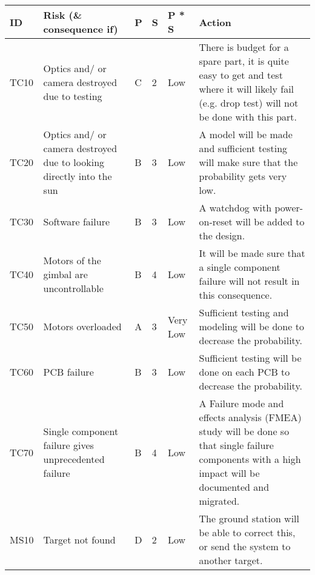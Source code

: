 

\begin{longtable}{|m{}| m{} |m{} |m{}|m{}| m{}|}

\hline
\textbf{ID} & \textbf{Risk (\& consequence if)} & \textbf{P} & \textbf{S} & \textbf{P * S} & \textbf{Action} \\ \hline


TC10 & Optics and/ or camera destroyed due to testing						& C & 2 & \cellcolor[HTML]{FCFF2F}Low 		& There is budget for a spare part, it is quite easy to get and test where it will likely fail (e.g. drop test) will not be done with this part.\\\hline

TC20 & Optics and/ or camera destroyed due to looking directly into the sun & B & 3 & \cellcolor[HTML]{FCFF2F}Low 		& A model will be made and sufficient testing will make sure that the probability gets very low.\\\hline

TC30 & Software failure														& B & 3 & \cellcolor[HTML]{FCFF2F}Low 		& A watchdog with power-on-reset will be added to the design.\\\hline

TC40 & Motors of the gimbal are uncontrollable								& B & 4 & \cellcolor[HTML]{FCFF2F}Low 		& It will be made sure that a single component failure will not result in this consequence.\\\hline

TC50 & Motors overloaded													& A & 3 & \cellcolor[HTML]{34FF34}Very Low 	& Sufficient testing and modeling will be done to decrease the probability.\\\hline

TC60 & PCB failure															& B & 3 & \cellcolor[HTML]{FCFF2F}Low 		& Sufficient testing will be done on each PCB to decrease the probability.\\\hline

TC70 & Single component failure gives unprecedented failure					& B & 4 & \cellcolor[HTML]{FCFF2F}Low			& A Failure mode and effects analysis (FMEA) study will be done so that single failure components with a high impact will be documented and migrated.\\\hline


MS10 & Target not found														& D & 2 & \cellcolor[HTML]{FCFF2F}Low			& The ground station will be able to correct this, or send the system to another target.\\\hline



\end{longtable}
